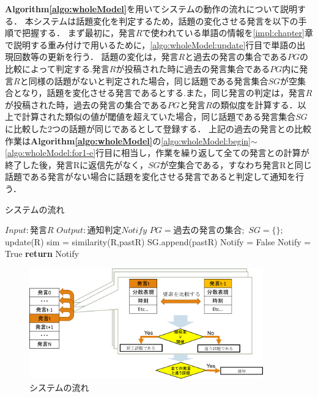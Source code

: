 \textbf{Algorithm\ref{algo:wholeModel}}を用いてシステムの動作の流れについて説明する．
本システムは話題変化を判定するため，話題の変化させる発言を以下の手順で把握する．
まず最初に，発言$R$で使われている単語の情報を\ref{impl:chapter}章で説明する重み付けで用いるために，\ref{algo:wholeModel:update}行目で単語の出現回数等の更新を行う．
話題の変化は，発言$R$と過去の発言の集合である$PG$の比較によって判定する.発言$R$が投稿された時に過去の発言集合である$PG$内に発言$R$と同様の話題がないと判定された場合，同じ話題である発言集合$SG$が空集合となり，話題を変化させる発言であるとする.また，同じ発言の判定は，発言$R$が投稿された時，過去の発言の集合である$PG$と発言$R$の類似度を計算する．以上で計算された類似の値が閾値を超えていた場合，同じ話題である発言集合$SG$に比較した2つの話題が同じであるとして登録する．
上記の過去の発言との比較作業は\textbf{Algorithm\ref{algo:wholeModel}}の\ref{algo:wholeModel:begin}$\sim$\ref{algo:wholeModel:for1-e}行目に相当し，作業を繰り返して全ての発言との計算が終了した後，発言Rに返信先がなく，$SG$が空集合である，すなわち発言Rと同じ話題である発言がない場合に話題を変化させる発言であると判定して通知を行う．
\begin{algorithm}
\caption{システムの流れ} \label{algo:wholeModel}
\begin{algorithmic}[1]
\State $Input:  発言R$
\State $Output: 通知判定Notify$
\State $PG = 過去の発言の集合;$%
	\State $SG = \{\};$\label{algo:wholeModel:begin}%
	\State update(R)\label{algo:wholeModel:update}
	 \label{algo:wholeModel:for1-b}
	 	\State sim = similarity(R,pastR)
			\State SG.append(pastR)
		\EndIf
	 \EndFor\label{algo:wholeModel:for1-e}
	 \State Notify = False
		\State Notify = True
	\EndIf
	\State \textbf{return} Notify
\EndProcedure
\end{algorithmic}
\end{algorithm}
\begin{figure}[htbp]
 \begin{center}
  \includegraphics[width=0.9\textwidth]{../images/3.The_Model/WholeModel.png}
  \caption{システムの流れ}
  \label{Fig:wholeModel}
  \vspace{-10pt}
 \end{center}
\end{figure}

